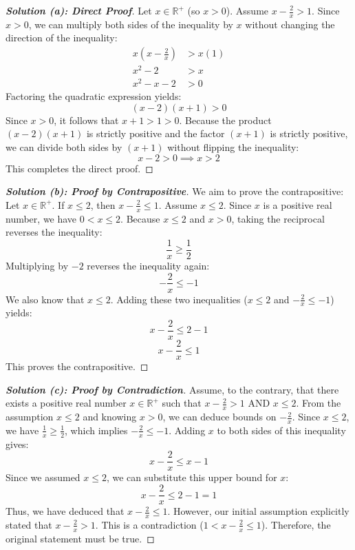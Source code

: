 \documentclass[11pt, a4paper]{article}
\theoremstyle{definition}
\theoremstyle{remark}
\newcommand{\R}{\mathbb{R}}
\begin{document}
\begin{proof}[\textbf{Solution (a): Direct Proof}]
Let $x \in \R^+$ (so $x > 0$). Assume $x - \frac{2}{x} > 1$. 
Since $x > 0$, we can multiply both sides of the inequality by $x$ without changing the direction of the inequality:
\begin{align*}
    x\left(x - \frac{2}{x}\right) &> x(1) \\
    x^2 - 2 &> x \\
    x^2 - x - 2 &> 0
\end{align*}
Factoring the quadratic expression yields:
\[ (x - 2)(x + 1) > 0 \]
Since $x > 0$, it follows that $x + 1 > 1 > 0$. Because the product $(x - 2)(x + 1)$ is strictly positive and the factor $(x + 1)$ is strictly positive, we can divide both sides by $(x + 1)$ without flipping the inequality:
\[ x - 2 > 0 \implies x > 2 \]
This completes the direct proof.
\end{proof}

\begin{proof}[\textbf{Solution (b): Proof by Contrapositive}]
We aim to prove the contrapositive: Let $x \in \R^+$. If $x \leq 2$, then $x - \frac{2}{x} \leq 1$.
Assume $x \leq 2$. Since $x$ is a positive real number, we have $0 < x \leq 2$. 
Because $x \leq 2$ and $x > 0$, taking the reciprocal reverses the inequality:
\[ \frac{1}{x} \geq \frac{1}{2} \]
Multiplying by $-2$ reverses the inequality again:
\[ -\frac{2}{x} \leq -1 \]
We also know that $x \leq 2$. Adding these two inequalities ($x \leq 2$ and $-\frac{2}{x} \leq -1$) yields:
\[ x - \frac{2}{x} \leq 2 - 1 \]
\[ x - \frac{2}{x} \leq 1 \]
This proves the contrapositive.
\end{proof}

\begin{proof}[\textbf{Solution (c): Proof by Contradiction}]
Assume, to the contrary, that there exists a positive real number $x \in \R^+$ such that $x - \frac{2}{x} > 1$ AND $x \leq 2$.
From the assumption $x \leq 2$ and knowing $x > 0$, we can deduce bounds on $-\frac{2}{x}$. 
Since $x \leq 2$, we have $\frac{1}{x} \geq \frac{1}{2}$, which implies $-\frac{2}{x} \leq -1$.
Adding $x$ to both sides of this inequality gives:
\[ x - \frac{2}{x} \leq x - 1 \]
Since we assumed $x \leq 2$, we can substitute this upper bound for $x$:
\[ x - \frac{2}{x} \leq 2 - 1 = 1 \]
Thus, we have deduced that $x - \frac{2}{x} \leq 1$. However, our initial assumption explicitly stated that $x - \frac{2}{x} > 1$. This is a contradiction ($1 < x - \frac{2}{x} \leq 1$). Therefore, the original statement must be true.
\end{proof}
\end{document}
